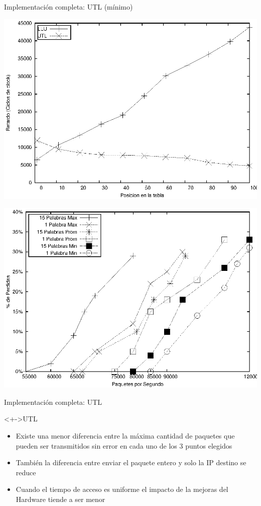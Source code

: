 \documentclass[xcolor=dvipsnames]{beamer}
\begin{document}
\begin{frame}{Implementación completa: UTL (mínimo)} 
\begin{flushleft}
\includegraphics[scale=0.20]{figures/llu-utlsof.eps} 
\end{flushleft}
\begin{center}
\includegraphics[scale=0.70]{figures/utlpres.eps} 
\end{center}
\end{frame}



\begin{frame}{Implementación completa: UTL} 
 \begin{block}<+->{UTL}   
    \begin{itemize}
      \scriptsize
     	\item Existe una menor diferencia entre la máxima cantidad de paquetes que pueden ser transmitidos sin error en cada uno de los 3 puntos elegidos
     	\item También la diferencia entre enviar el paquete entero y solo la IP destino se reduce
	\item Cuando el tiempo de acceso es uniforme el impacto de la mejoras del Hardware tiende a ser menor
    \end{itemize}
  \end{block}
\end{frame}
\end{document}
